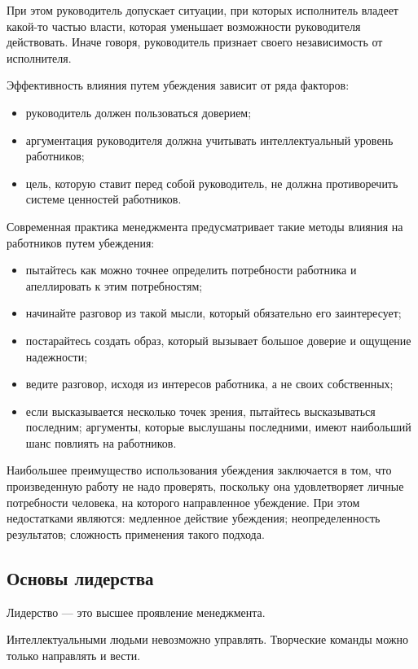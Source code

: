 \documentclass[a4paper,12pt,oneside,final]{extarticle}
\numberwithin{equation}{section}
\begin{document}
При этом руководитель допускает ситуации, при которых исполнитель владеет какой-то частью власти, которая уменьшает возможности руководителя действовать. Иначе говоря, руководитель признает своего независимость от исполнителя.

Эффективность влияния путем убеждения зависит от ряда факторов:
\begin{itemize}
	\item руководитель должен пользоваться доверием;
	\item аргументация руководителя должна учитывать интеллектуальный уровень работников;
	\item цель, которую ставит перед собой руководитель, не должна противоречить системе ценностей работников.
\end{itemize}

Современная практика менеджмента предусматривает такие методы влияния на работников путем убеждения:
\begin{itemize}
	\item пытайтесь как можно точнее определить потребности работника и апеллировать к этим потребностям;
	\item начинайте разговор из такой мысли, который обязательно его заинтересует;
	\item постарайтесь создать образ, который вызывает большое доверие и ощущение надежности;
	\item ведите разговор, исходя из интересов работника, а не своих собственных;
	\item если высказывается несколько точек зрения, пытайтесь высказываться последним; аргументы, которые выслушаны последними, имеют наибольший шанс повлиять на работников.
\end{itemize}

Наибольшее преимущество использования убеждения заключается в том, что произведенную работу не надо проверять, поскольку она удовлетворяет личные потребности человека, на которого направленное убеждение. 
При этом недостатками являются: медленное действие убеждения; неопределенность результатов; сложность применения такого подхода.

\subsection{Основы лидерства}
Лидерство --- это высшее проявление менеджмента.

Интеллектуальными людьми невозможно управлять. 
Творческие команды можно только направлять и вести.
\end{document}
